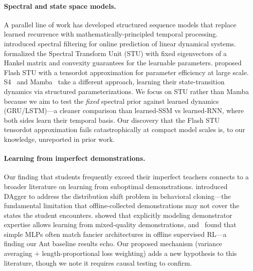 \paragraph{Spectral and state space models.}
A parallel line of work has developed structured sequence models that replace learned recurrence with mathematically-principled temporal processing.
\citet{hazan2017learning} introduced spectral filtering for online prediction of linear dynamical systems.
\citet{agarwal2024spectral} formalized the Spectral Transform Unit (STU) with fixed eigenvectors of a Hankel matrix and convexity guarantees for the learnable parameters.
\citet{liu2025flashstu} proposed Flash STU with a tensordot approximation for parameter efficiency at large scale.
S4~\citep{gu2022s4} and Mamba~\citep{gu2024mamba} take a different approach, learning their state-transition dynamics via structured parameterizations.
We focus on STU rather than Mamba because we aim to test the \emph{fixed} spectral prior against learned dynamics (GRU/LSTM)---a cleaner comparison than learned-SSM vs learned-RNN, where both sides learn their temporal basis.
Our discovery that the Flash STU tensordot approximation fails catastrophically at compact model scales is, to our knowledge, unreported in prior work.

\paragraph{Learning from imperfect demonstrations.}
Our finding that students frequently exceed their imperfect teachers connects to a broader literature on learning from suboptimal demonstrations.
\citet{ross2011dagger} introduced DAgger to address the distribution shift problem in behavioral cloning---the fundamental limitation that offline-collected demonstrations may not cover the states the student encounters.
\citet{beliaev2022ileed} showed that explicitly modeling demonstrator expertise allows learning from mixed-quality demonstrations, and~\citet{emmons2022rvs} found that simple MLPs often match fancier architectures in offline supervised RL---a finding our Ant baseline results echo.
Our proposed mechanism (variance averaging + length-proportional loss weighting) adds a new hypothesis to this literature, though we note it requires causal testing to confirm.
